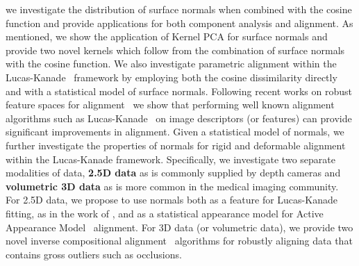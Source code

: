 we investigate the distribution of surface normals when combined with the
cosine function and provide applications for both component analysis and
alignment. As mentioned, we show the application of Kernel PCA for surface
normals and provide two novel kernels which follow from the combination
of surface normals with the cosine function. We also investigate parametric
alignment within the Lucas-Kanade~\cite{lucas1981iterative} framework
by employing both the cosine dissimilarity directly and with a statistical
model of surface normals. Following recent works on robust feature spaces for
alignment~\cite{antonakos2015feature}
we show that performing well known alignment algorithms such as
Lucas-Kanade~\cite{lucas1981iterative} on image descriptors (or features) can
provide significant improvements in alignment. Given a statistical model
of normals, we further investigate the properties of normals for rigid and
deformable alignment within the Lucas-Kanade framework. Specifically, we
investigate two separate modalities of data, \textbf{2.5D data} as is
commonly supplied by depth cameras and \textbf{volumetric 3D data} as is more common
in the medical imaging community. For 2.5D data, we propose to use normals both
as a feature for Lucas-Kanade~\cite{lucas1981iterative} fitting,
as in the work of \citet{antonakos2015feature}, and as a statistical
appearance model for Active Appearance Model~\cite{cootes2001active} alignment.
For 3D data (or volumetric data), we provide two novel
inverse compositional alignment~\cite{baker2004lucas} algorithms for robustly
aligning data that contains gross outliers such as occlusions.

